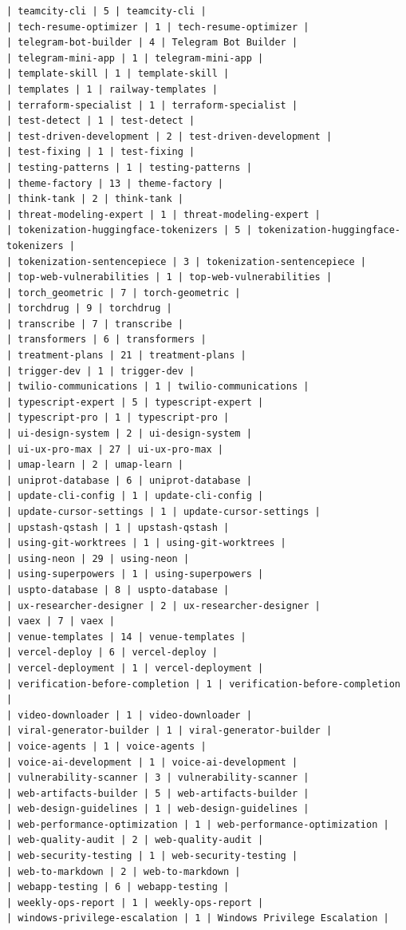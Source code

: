 \begin{Verbatim}[breaklines,breakanywhere,fontsize=\footnotesize]
| teamcity-cli | 5 | teamcity-cli |
| tech-resume-optimizer | 1 | tech-resume-optimizer |
| telegram-bot-builder | 4 | Telegram Bot Builder |
| telegram-mini-app | 1 | telegram-mini-app |
| template-skill | 1 | template-skill |
| templates | 1 | railway-templates |
| terraform-specialist | 1 | terraform-specialist |
| test-detect | 1 | test-detect |
| test-driven-development | 2 | test-driven-development |
| test-fixing | 1 | test-fixing |
| testing-patterns | 1 | testing-patterns |
| theme-factory | 13 | theme-factory |
| think-tank | 2 | think-tank |
| threat-modeling-expert | 1 | threat-modeling-expert |
| tokenization-huggingface-tokenizers | 5 | tokenization-huggingface-tokenizers |
| tokenization-sentencepiece | 3 | tokenization-sentencepiece |
| top-web-vulnerabilities | 1 | top-web-vulnerabilities |
| torch_geometric | 7 | torch-geometric |
| torchdrug | 9 | torchdrug |
| transcribe | 7 | transcribe |
| transformers | 6 | transformers |
| treatment-plans | 21 | treatment-plans |
| trigger-dev | 1 | trigger-dev |
| twilio-communications | 1 | twilio-communications |
| typescript-expert | 5 | typescript-expert |
| typescript-pro | 1 | typescript-pro |
| ui-design-system | 2 | ui-design-system |
| ui-ux-pro-max | 27 | ui-ux-pro-max |
| umap-learn | 2 | umap-learn |
| uniprot-database | 6 | uniprot-database |
| update-cli-config | 1 | update-cli-config |
| update-cursor-settings | 1 | update-cursor-settings |
| upstash-qstash | 1 | upstash-qstash |
| using-git-worktrees | 1 | using-git-worktrees |
| using-neon | 29 | using-neon |
| using-superpowers | 1 | using-superpowers |
| uspto-database | 8 | uspto-database |
| ux-researcher-designer | 2 | ux-researcher-designer |
| vaex | 7 | vaex |
| venue-templates | 14 | venue-templates |
| vercel-deploy | 6 | vercel-deploy |
| vercel-deployment | 1 | vercel-deployment |
| verification-before-completion | 1 | verification-before-completion |
| video-downloader | 1 | video-downloader |
| viral-generator-builder | 1 | viral-generator-builder |
| voice-agents | 1 | voice-agents |
| voice-ai-development | 1 | voice-ai-development |
| vulnerability-scanner | 3 | vulnerability-scanner |
| web-artifacts-builder | 5 | web-artifacts-builder |
| web-design-guidelines | 1 | web-design-guidelines |
| web-performance-optimization | 1 | web-performance-optimization |
| web-quality-audit | 2 | web-quality-audit |
| web-security-testing | 1 | web-security-testing |
| web-to-markdown | 2 | web-to-markdown |
| webapp-testing | 6 | webapp-testing |
| weekly-ops-report | 1 | weekly-ops-report |
| windows-privilege-escalation | 1 | Windows Privilege Escalation |

\end{Verbatim}
